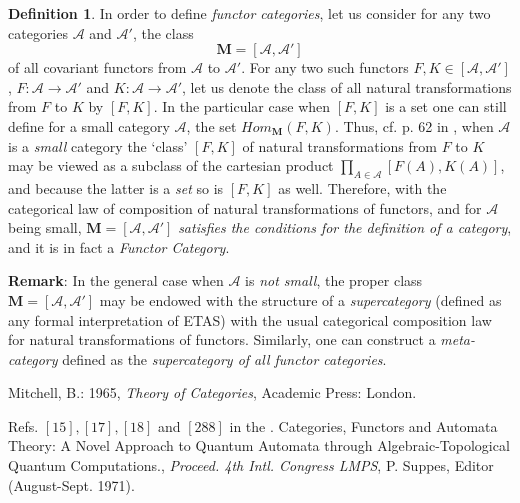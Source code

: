 \documentclass[12pt]{article}
\theoremstyle{plain}
\theoremstyle{definition}
\newtheorem{definition}{Definition}[section]
\numberwithin{equation}{section}
\newcommand{\A}{\mathcal A}
\begin{document}
\begin{definition}
In order to define {\em functor categories}, let us consider for any two categories
$\mathcal{\A}$ and $\mathcal{\A'}$, the class
$$\textbf{M} = [\mathcal{\A},\mathcal{\A'}]$$
of all covariant functors from $\mathcal{\A}$ to $\mathcal{\A'}$. For any two such functors $F, K \in [\mathcal{\A}, \mathcal{\A'}]$, $ F: \mathcal{\A} \rightarrow \mathcal{\A'}$ and $ K: \mathcal{\A} \rightarrow \mathcal{\A'}$,
let us denote the class of all natural transformations from $F$ to $K$ by $[F, K]$. In the particular case when $[F, K]$ is a set one can still define for a small category $\mathcal{\A}$, the set $Hom_{\textbf{M}}(F,K)$. Thus, cf. p. 62 in \cite{Mitchell65}, when $\mathcal{\A}$ is a {\em small} category the `class' $[F, K]$ of natural transformations from $F$ to $K$ may be viewed as a subclass of the cartesian product $\prod_{A \in \mathcal{\A}}[F(A), K(A)]$, and because the latter is a {\em set} so is $[F, K]$ as well. Therefore, with the categorical law of composition of natural transformations of functors, and for $\mathcal{\A}$ being small, $\textbf{M} = [\mathcal{\A},\mathcal{\A'}]$ {\em satisfies the conditions for the definition of a category}, and it is in fact a {\em Functor Category}.
\end{definition}

\textbf{Remark}: In the general case when $\mathcal{\A}$ is {\em not small}, the proper class $\textbf{M} = [\mathcal{\A}, \mathcal{\A'}]$ may be endowed with the structure of a {\em supercategory} (defined as any formal interpretation of ETAS) with the usual categorical composition law for natural transformations of functors. Similarly, one can construct a {\em meta-category} defined as the {\em supercategory of all functor categories}.

\begin{thebibliography}{99}

Mitchell, B.: 1965, \emph{Theory of Categories}, Academic Press: London.

Refs. $[15],[17],[18]$  and $[288]$ in the
.
Categories, Functors and Automata Theory: A Novel Approach to Quantum Automata through Algebraic-Topological Quantum Computations., \emph{Proceed. 4th Intl. Congress LMPS}, P. Suppes, Editor (August-Sept. 1971).

\end{thebibliography}

\end{document}

